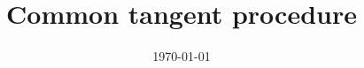 \documentclass[12pt]{article}
\title{Common tangent procedure \vspace{-0.9cm}}%
\date{\today} %
\begin{document}
\maketitle %

\begin{comment}
\clearpage




\begin{table}[h!]
\centering
\begin{tabular}{|c|c|}
\hline
Volume     & Energy              \\ \hline
231.258240 & -3.766021868726E+03 \\ \hline
233.804750 & -3.766022502636E+03 \\ \hline
235.978198 & -3.766022676933E+03 \\ \hline
236.370909 & -3.766022674135E+03 \\ \hline
238.954760 & -3.766022411469E+03 \\ \hline
241.556358 & -3.766021721601E+03 \\ \hline
244.175148 & -3.766020622680E+03 \\ \hline
246.816007 & -3.766019128209E+03 \\ \hline
249.468797 & -3.766017256610E+03 \\ \hline
252.148054 & -3.766015013924E+03 \\ \hline
254.834741 & -3.766012425245E+03 \\ \hline
\end{tabular}
\caption{11 EOS volumes Aragonite: S.G. = $P m c n$}
\label{my-label}
\end{table}


\begin{sidewaystable}
\centering
\begin{adjustbox}{width={\textwidth},totalheight={\textheight},keepaspectratio}%
\begin{tabular}{ccclccccccccc}


\end{tabular}
\end{adjustbox}
  \caption{Scanmodes on Aragonite. In color the phases that I consider that are the same. }
    \label{phases}
\end{sidewaystable}


\end{comment}
\end{document}
